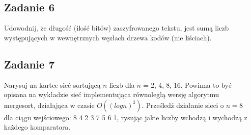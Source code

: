 \documentclass{article}
\begin{document}
\subsection*{Zadanie 6}
Udowodnij, że długość (ilość bitów) zaszyfrowanego tekstu, jest sumą liczb występujących w
wewnętrznych węzłach drzewa kodów (nie liściach).

\subsection*{Zadanie 7}
Narysuj na kartce sieć sortującą $n$ liczb dla $n$ = 2, 4, 8, 16. Powinna to być opisana na
wykładzie sieć implementująca równoległą wersję algorytmu mergesort, działająca w
czasie $O((log n)^2)$. Prześledź działanie sieci o $n = 8$ dla ciągu wejściowego: 8 4 2 3 7 5 6
1, rysując jakie liczby wchodzą i wychodzą z każdego komparatora.
\end{document}
